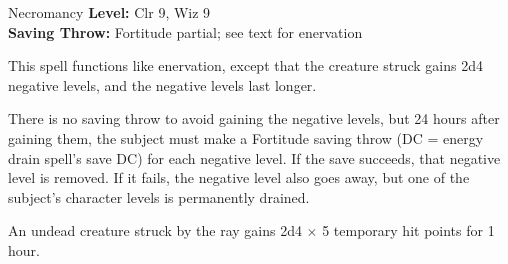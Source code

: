 {Necromancy}
{
	\textbf{Level:}
	Clr 9, Wiz 9\\
	\textbf{Saving Throw:}
	Fortitude partial; see text for enervation\\
}
{
	This spell functions like enervation, except that the creature struck gains 2d4 negative levels, and the negative levels last longer.

	There is no saving throw to avoid gaining the negative levels, but 24 hours after gaining them, the subject must make a Fortitude saving throw (DC = energy drain spell's save DC) for each negative level. If the save succeeds, that negative level is removed. If it fails, the negative level also goes away, but one of the subject's character levels is permanently drained.

	An undead creature struck by the ray gains 2d4 $\times$ 5 temporary hit points for 1 hour.

}
